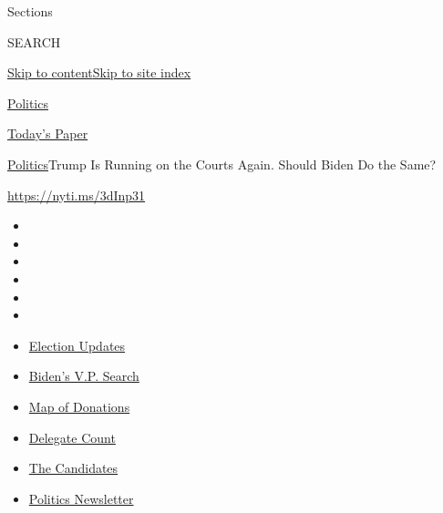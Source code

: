 Sections

SEARCH

\protect\hyperlink{site-content}{Skip to
content}\protect\hyperlink{site-index}{Skip to site index}

\href{https://www.nytimes.com/section/politics}{Politics}

\href{https://myaccount.nytimes.com/auth/login?response_type=cookie\&client_id=vi}{}

\href{https://www.nytimes.com/section/todayspaper}{Today's Paper}

\href{/section/politics}{Politics}\textbar{}Trump Is Running on the
Courts Again. Should Biden Do the Same?

\url{https://nyti.ms/3dInp31}

\begin{itemize}
\item
\item
\item
\item
\item
\item
\end{itemize}

\begin{itemize}
\item
  \href{https://www.nytimes.com/2020/07/31/us/elections/biden-vs-trump.html?action=click\&pgtype=Article\&state=default\&region=TOP_BANNER\&context=storylines_menu}{Election
  Updates}
\item
  \href{https://www.nytimes.com/article/biden-vice-president-2020.html?action=click\&pgtype=Article\&state=default\&region=TOP_BANNER\&context=storylines_menu}{Biden's
  V.P. Search}
\item
  \href{https://www.nytimes.com/interactive/2020/07/24/us/politics/trump-biden-campaign-donors.html?action=click\&pgtype=Article\&state=default\&region=TOP_BANNER\&context=storylines_menu}{Map
  of Donations}
\item
  \href{https://www.nytimes.com/interactive/2020/us/elections/delegate-count-primary-results.html?action=click\&pgtype=Article\&state=default\&region=TOP_BANNER\&context=storylines_menu}{Delegate
  Count}
\item
  \href{https://www.nytimes.com/interactive/2019/us/politics/2020-presidential-candidates.html?action=click\&pgtype=Article\&state=default\&region=TOP_BANNER\&context=storylines_menu}{The
  Candidates}
\item
  \href{https://www.nytimes.com/newsletters/politics?action=click\&pgtype=Article\&state=default\&region=TOP_BANNER\&context=storylines_menu}{Politics
  Newsletter}
\end{itemize}

